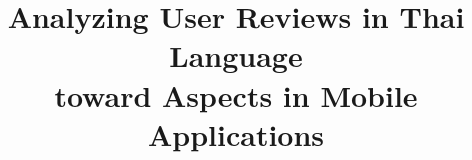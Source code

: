 \documentclass[conference,a4paper]{IEEEtran}
\begin{document}
%
\title{Analyzing User Reviews in Thai Language\\ toward Aspects in Mobile Applications}








% 
\end{document}

